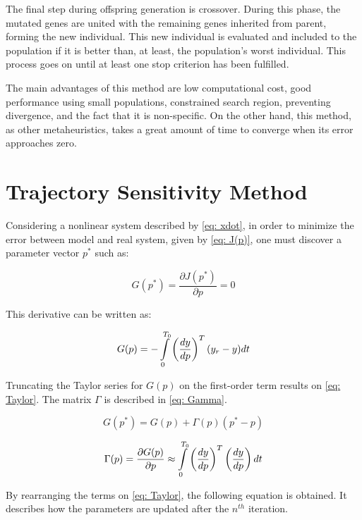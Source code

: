 The final step during offspring generation is crossover. During this phase, the mutated genes are united with the remaining genes inherited from parent, forming the new individual. This new individual is evaluated and included to the population if it is better than, at least, the population's worst individual. This process goes on until at least one stop criterion has been fulfilled.

The main advantages of this method are low computational cost, good performance using small populations, constrained search region, preventing divergence, and the fact that it is non-specific. On the other hand, this method, as other metaheuristics, takes a great amount of time to converge when its error approaches zero.

\section{Trajectory Sensitivity Method}

Considering a nonlinear system described by \eqref{eq: xdot}, in order to minimize the error between model and real system, given by \eqref{eq: J(p)}, one must discover a parameter vector $p^{*}$ such as:

\begin{equation}
	G(p^{*}) = \frac{\partial J(p^{*})}{\partial p} = 0
\end{equation}

This derivative can be written as:

\begin{equation}	
	G(p) = -\int\displaylimits_{0}^{T_{0}} \left(\frac{dy}{dp}\right)^{T} (y_{r} - y) dt
	\label{eq: G(p)}
\end{equation}

Truncating the Taylor series for $G(p)$ on the first-order term results on \eqref{eq: Taylor}. The matrix $\Gamma$ is described in \eqref{eq: Gamma}.

\begin{equation}
	G(p^{*}) = G(p) + \Gamma (p)(p^{*} - p)
	\label{eq: Taylor}
\end{equation}

\begin{equation}
	\Gamma (p) = \frac{\partial G(p)}{\partial p} \approx \int\displaylimits_{0}^{T_{0}} \left(\frac{dy}{dp}\right)^{T} \left(\frac{dy}{dp}\right) dt
	\label{eq: Gamma}
\end{equation}

By rearranging the terms on \eqref{eq: Taylor}, the following equation is obtained. It describes how the parameters are updated after the $n^{th}$ iteration.

